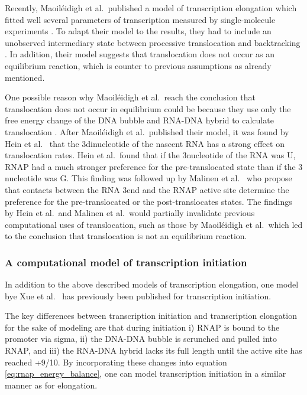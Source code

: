 Recently, Maoiléidigh et al.\ published a model of transcription elongation
which fitted well several parameters of transcription measured by
single-molecule experiments \cite{o_maoileidigh_unified_2011}. To adapt their
model to the results, they had to include an unobserved intermediary state
between processive translocation and backtracking
\cite{o_maoileidigh_unified_2011}. In addition, their model suggests that
translocation does not occur as an equilibrium reaction, which is counter to
previous assumptions as already mentioned.

One possible reason why Maoiléidigh et al.\ reach the conclusion that
translocation does not occur in equilibrium could be because they use only the
free energy change of the DNA bubble and RNA-DNA hybrid to calculate
translocation \cite{o_maoileidigh_unified_2011}. After Maoiléidigh et al.\
published their model, it was found by Hein et al.\ \cite{hein_rna_2011} that
the 3\ppp dinucleotide of the nascent RNA has a strong effect on translocation
rates. Hein et al.\ found that if the 3\ppp nucleotide of the RNA was U, RNAP had a
much stronger preference for the pre-translocated state than if the 3\ppp
nucleotide was G. This finding was followed up by Malinen et al.\
\cite{malinen_active_2012} who propose that contacts between the RNA 3\ppp end
and the RNAP active site determine the preference for the pre-translocated or
the post-translocates states. The findings by Hein et al.\ and Malinen et al.\
would partially invalidate previous computational uses of translocation, such
as those by Maoiléidigh et al.\ which led to the conclusion that translocation
is not an equilibrium reaction.

\subsubsection{A computational model of transcription initiation}
In addition to the above described models of transcription elongation, one
model bye Xue et al.\ \cite{xue_kinetic_2008} has previously been published for
transcription initiation.

The key differences between transcription initiation and transcription
elongation for the sake of modeling are that during initiation i) RNAP is bound
to the promoter via sigma, ii) the DNA-DNA bubble is scrunched and pulled into
RNAP, and iii) the RNA-DNA hybrid lacks its full length until the active site
has reached +9/10. By incorporating these changes into equation
\eqref{eq:rnap_energy_balance}, one can model transcription initiation in a
similar manner as for elongation.

